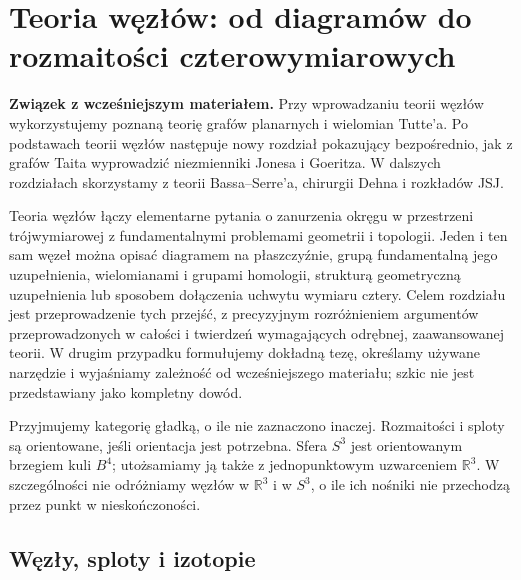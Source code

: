 


\chapter{Teoria węzłów: od diagramów do rozmaitości czterowymiarowych}
\label{ch:teoria-wezlow}

\noindent\textbf{Związek z wcześniejszym materiałem.}
Przy wprowadzaniu teorii węzłów wykorzystujemy poznaną teorię
grafów planarnych i wielomian Tutte'a. Po podstawach teorii
węzłów następuje nowy rozdział pokazujący bezpośrednio, jak
z grafów Taita wyprowadzić niezmienniki Jonesa i Goeritza.
W dalszych rozdziałach skorzystamy z teorii Bassa--Serre'a,
chirurgii Dehna i rozkładów JSJ.


Teoria węzłów łączy elementarne pytania o zanurzenia okręgu w przestrzeni
trójwymiarowej z fundamentalnymi problemami geometrii i topologii.
Jeden i ten sam węzeł można opisać diagramem na płaszczyźnie, grupą
fundamentalną jego uzupełnienia, wielomianami i grupami homologii,
strukturą geometryczną uzupełnienia lub sposobem dołączenia uchwytu
wymiaru cztery. Celem rozdziału jest przeprowadzenie tych przejść,
z precyzyjnym rozróżnieniem argumentów przeprowadzonych w całości
i twierdzeń wymagających odrębnej, zaawansowanej teorii. W drugim
przypadku formułujemy dokładną tezę, określamy używane narzędzie
i wyjaśniamy zależność od wcześniejszego materiału; szkic nie jest
przedstawiany jako kompletny dowód.

Przyjmujemy kategorię gładką, o ile nie zaznaczono inaczej.
Rozmaitości i sploty są orientowane, jeśli orientacja jest potrzebna.
Sfera $S^3$ jest orientowanym brzegiem kuli $B^4$; utożsamiamy ją także
z jednopunktowym uzwarceniem $\mathbb R^3$. W szczególności
nie odróżniamy węzłów w $\mathbb R^3$ i w $S^3$, o ile ich nośniki
nie przechodzą przez punkt w nieskończoności.

\section{Węzły, sploty i izotopie}
\label{sec:kt-podstawy}

